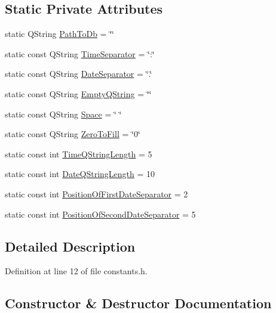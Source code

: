 \subsection*{Static Private Attributes}
\begin{DoxyCompactItemize}
\item 
static Q\+String \hyperlink{classConstants_a2a8fc008322275c6dfbc1f18a781c405}{Path\+To\+Db} = \char`\"{}\char`\"{}
\item 
static const Q\+String \hyperlink{classConstants_aa6a4e4e111634badc8b8aeba9df024ce}{Time\+Separator} = \char`\"{}\+:\char`\"{}
\item 
static const Q\+String \hyperlink{classConstants_a1b884c97c8f0c86fa5f8e050e38deca4}{Date\+Separator} = \char`\"{}.\char`\"{}
\item 
static const Q\+String \hyperlink{classConstants_a60b54ff297949426391e55991f80ccf2}{Empty\+Q\+String} = \char`\"{}\char`\"{}
\item 
static const Q\+String \hyperlink{classConstants_ade4aef58a5c7280c4f0bd40ba7b30f3c}{Space} = \char`\"{} \char`\"{}
\item 
static const Q\+String \hyperlink{classConstants_ace4bddf4b2dc0e05c8fec643238531a9}{Zero\+To\+Fill} = \char`\"{}0\char`\"{}
\item 
static const int \hyperlink{classConstants_a577e140cbb46e0fe143af8c18c29cee1}{Time\+Q\+String\+Length} = 5
\item 
static const int \hyperlink{classConstants_ae5b9b8df2388680fdacc61f9c247307d}{Date\+Q\+String\+Length} = 10
\item 
static const int \hyperlink{classConstants_aeade44a42999a2037171cc8b04031edb}{Position\+Of\+First\+Date\+Separator} = 2
\item 
static const int \hyperlink{classConstants_a6d9e83adc428b25381bc25b2e38843ea}{Position\+Of\+Second\+Date\+Separator} = 5
\end{DoxyCompactItemize}


\subsection{Detailed Description}


Definition at line 12 of file constants.\+h.



\subsection{Constructor \& Destructor Documentation}
\hypertarget{classConstants_af395b3c1d6f0577f4880a21a257aa1db}{}\label{classConstants_af395b3c1d6f0577f4880a21a257aa1db} 
